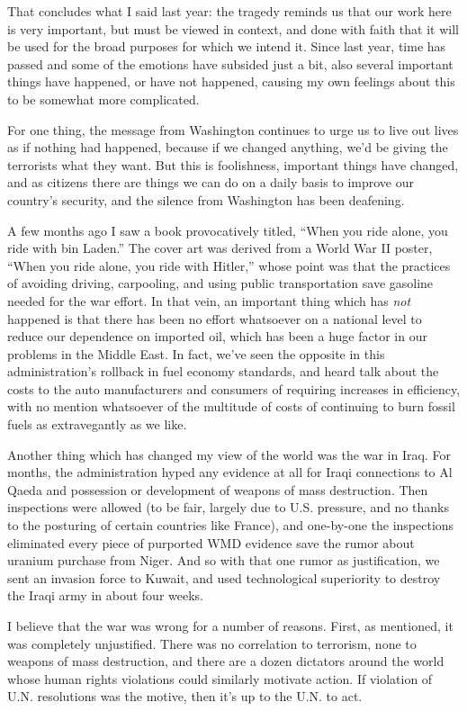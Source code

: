 \documentclass{report}
\begin{document}
That concludes what I said last year: the tragedy reminds us that our work here
is very important, but must be viewed in context, and done with faith that it
will be used for the broad purposes for which we intend it.  Since last year,
time has passed and some of the emotions have subsided just a bit, also several
important things have happened, or have not happened, causing my own feelings
about this to be somewhat more complicated.

For one thing, the message from Washington continues to urge us to live out
lives as if nothing had happened, because if we changed anything, we'd be
giving the terrorists what they want.  But this is foolishness, important
things have changed, and as citizens there are things we can do on a daily
basis to improve our country's security, and the silence from Washington has
been deafening.

A few months ago I saw a book provocatively titled, ``When you ride alone, you
ride with bin Laden.''  The cover art was derived from a World War II poster,
``When you ride alone, you ride with Hitler,'' whose point was that the
practices of avoiding driving, carpooling, and using public transportation save
gasoline needed for the war effort.  In that vein, an important thing which has
{\em not} happened is that there has been no effort whatsoever on a national
level to reduce our dependence on imported oil, which has been a huge factor in
our problems in the Middle East.  In fact, we've seen the opposite in this
administration's rollback in fuel economy standards, and heard talk about the
costs to the auto manufacturers and consumers of requiring increases in
efficiency, with no mention whatsoever of the multitude of costs of continuing
to burn fossil fuels as extravegantly as we like.

Another thing which has changed my view of the world was the war in Iraq.  For
months, the administration hyped any evidence at all for Iraqi connections to
Al Qaeda and possession or development of weapons of mass destruction.  Then
inspections were allowed (to be fair, largely due to U.S. pressure, and no
thanks to the posturing of certain countries like France), and one-by-one the
inspections eliminated every piece of purported WMD evidence save the rumor
about uranium purchase from Niger.  And so with that one rumor as
justification, we sent an invasion force to Kuwait, and used technological
superiority to destroy the Iraqi army in about four weeks.

I believe that the war was wrong for a number of reasons.  First, as mentioned,
it was completely unjustified.  There was no correlation to terrorism, none to
weapons of mass destruction, and there are a dozen dictators around the world
whose human rights violations could similarly motivate action.  If violation of
U.N. resolutions was the motive, then it's up to the U.N. to act.
\end{document}

